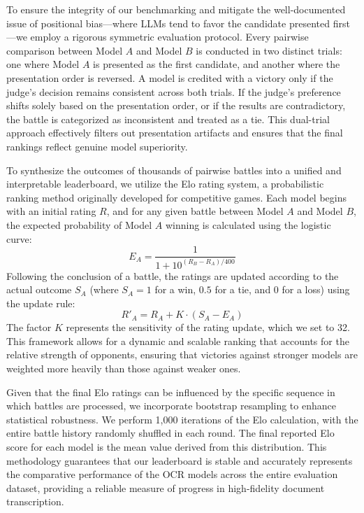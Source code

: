 \documentclass{article}
\begin{document}
To ensure the integrity of our benchmarking and mitigate the well-documented issue of positional bias—where LLMs tend to favor the candidate presented first—we employ a rigorous symmetric evaluation protocol. Every pairwise comparison between Model $A$ and Model $B$ is conducted in two distinct trials: one where Model $A$ is presented as the first candidate, and another where the presentation order is reversed. A model is credited with a victory only if the judge’s decision remains consistent across both trials. If the judge's preference shifts solely based on the presentation order, or if the results are contradictory, the battle is categorized as inconsistent and treated as a tie. This dual-trial approach effectively filters out presentation artifacts and ensures that the final rankings reflect genuine model superiority.

To synthesize the outcomes of thousands of pairwise battles into a unified and interpretable leaderboard, we utilize the Elo rating system, a probabilistic ranking method originally developed for competitive games. Each model begins with an initial rating $R$, and for any given battle between Model $A$ and Model $B$, the expected probability of Model $A$ winning is calculated using the logistic curve:
\begin{equation}
E_A = \frac{1}{1 + 10^{(R_B - R_A) / 400}}
\end{equation}
Following the conclusion of a battle, the ratings are updated according to the actual outcome $S_A$ (where $S_A=1$ for a win, $0.5$ for a tie, and $0$ for a loss) using the update rule:
\begin{equation}
R'_A = R_A + K \cdot (S_A - E_A)
\end{equation}
The factor $K$ represents the sensitivity of the rating update, which we set to 32. This framework allows for a dynamic and scalable ranking that accounts for the relative strength of opponents, ensuring that victories against stronger models are weighted more heavily than those against weaker ones.

Given that the final Elo ratings can be influenced by the specific sequence in which battles are processed, we incorporate bootstrap resampling to enhance statistical robustness. We perform 1,000 iterations of the Elo calculation, with the entire battle history randomly shuffled in each round. The final reported Elo score for each model is the mean value derived from this distribution. This methodology guarantees that our leaderboard is stable and accurately represents the comparative performance of the OCR models across the entire evaluation dataset, providing a reliable measure of progress in high-fidelity document transcription.
\end{document}
